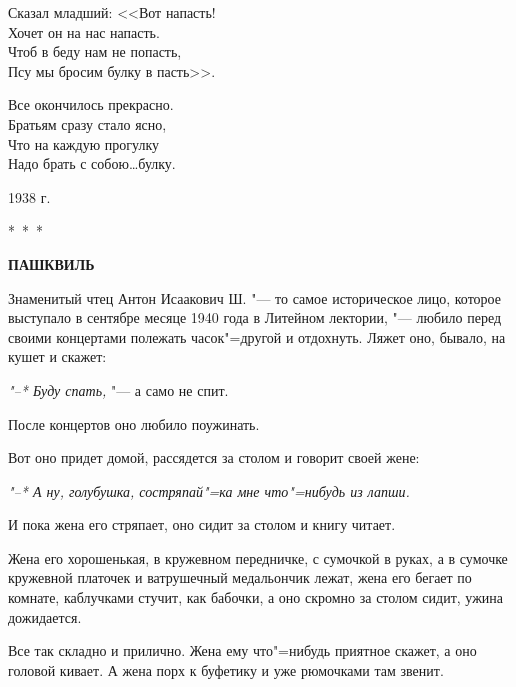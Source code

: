 \documentclass[12pt]{extarticle}
\begin{document}
\begin{flushright}
\vspace{0.1cm}
\parbox{11cm}{\noindent Сказал младший: <<Вот напасть! \\
Хочет он на нас напасть. \\
Чтоб в беду нам не попасть, \\
Псу мы бросим булку в пасть>>. 
}
\end{flushright}

\begin{center}
\vspace{0.1cm}
\parbox{8.5cm}{\noindent Все окончилось прекрасно. \\
Братьям сразу стало ясно, \\
Что на каждую прогулку \\
Надо брать с собою\dots булку.
}
\end{center}

\begin{flushright}
1938 г.
\end{flushright}

\begin{center}
\vspace{0.1cm}
\large
*~*~*

\vspace{0.3cm}
\bf
ПАШКВИЛЬ
\end{center}

\rm 

Знаменитый чтец Антон Исаакович Ш. "---  то
самое историческое лицо, которое выступало в
сентябре месяце 1940 года в Литейном  лектории, 
"--- любило перед своими концертами  полежать  
часок"=другой и отдохнуть.  Ляжет  оно,
бывало, на кушет и скажет:
   
\textit{"--* Буду спать,} "--- а само не спит.
    
После концертов оно любило поужинать.
    
Вот оно придет домой, рассядется за столом 
и говорит своей жене:
    
\textit{"--* А ну, голубушка, состряпай"=ка мне что"=нибудь 
из лапши.}
    
И пока жена его стряпает,  оно  сидит за
столом и книгу читает.
    
Жена его хорошенькая, в кружевном передничке, 
с сумочкой в руках,  а в сумочке кружевной 
платочек  и  ватрушечный  медальончик
лежат, жена его бегает по комнате, каблучками 
стучит, как бабочки,  а  оно  скромно  за
столом сидит, ужина дожидается.
    
Все  так складно  и прилично.  Жена  ему
что"=нибудь  приятное скажет,  а оно  головой
кивает. А жена порх к буфетику  и уже рюмочками 
там звенит.
    
\end{document}
